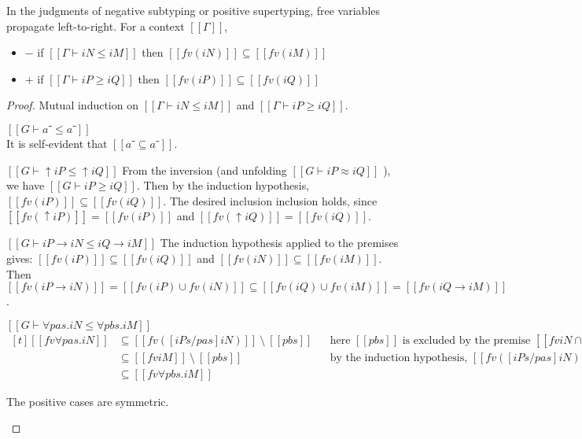 \begin{lemma} \label{lemma:fv-propagation}
  In the judgments of negative subtyping or positive supertyping,
  free variables propagate left-to-right. For a context $[[Γ]]$,
  \begin{itemize}
    \item $-$ if $[[Γ ⊢ iN ≤ iM]]$ then $[[fv(iN)]] \subseteq [[fv(iM)]]$
    \item $+$ if $[[Γ ⊢ iP ≥ iQ]]$ then $[[fv(iP)]] \subseteq [[fv(iQ)]]$
  \end{itemize}
\end{lemma}
\begin{proof}
  Mutual induction on $[[Γ ⊢ iN ≤ iM]]$ and $[[Γ ⊢ iP ≥ iQ]]$.
  \begin{caseof}
  \item $[[G ⊢ a⁻ ≤ a⁻]]$\\
    It is self-evident that $[[{a⁻} ⊆ {a⁻}]]$.
  \item $[[G ⊢ ↑iP ≤ ↑iQ]]$
    From the inversion (and unfolding $[[G ⊢ iP ≈ iQ]]$ ), we have
    $[[G ⊢ iP ≥ iQ]]$. Then by the induction hypothesis,
    $[[fv(iP)]] \subseteq [[fv(iQ)]]$. The desired inclusion
    inclusion holds, since $[[fv(↑iP)]] = [[fv(iP)]]$ and
    $[[fv(↑iQ)]] = [[fv(iQ)]]$.
  \item $[[G ⊢ iP → iN ≤ iQ → iM]]$
    The induction hypothesis applied to the premises gives:
    $[[fv(iP)]] \subseteq [[fv(iQ)]]$ and
    $[[fv(iN)]] \subseteq [[fv(iM)]]$.
    Then $[[fv(iP → iN)]] = [[fv(iP) ∪ fv(iN)]] \subseteq
    [[fv(iQ) ∪ fv(iM)]] = [[fv(iQ → iM)]]$.

  \item $[[G ⊢ ∀pas.iN ≤ ∀pbs.iM]]$\\
    $
    \begin{aligned}[t]
      [[fv ∀pas.iN ]] &\subseteq [[fv ([iPs/pas] iN) ]] ~\setminus~ [[{pbs}]] 
                      &&   \text{here $[[{pbs}]]$ is excluded by the premise $[[fv iN ∩ {pbs} = ∅]]$}\\
                      &\subseteq [[fv iM]] ~\setminus~ [[{pbs}]]
                      &&   \text{by the induction hypothesis, } [[fv ([iPs/pas] iN) ]] \subseteq [[fv iM]] \\
                      &\subseteq [[fv ∀pbs.iM]]
    \end{aligned}
    $
  \item The positive cases are symmetric.
  \end{caseof}
\end{proof}

